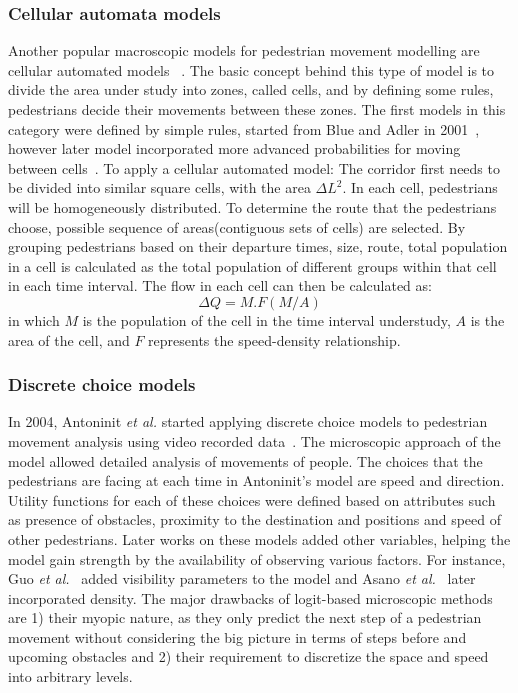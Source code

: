 \subsubsection{Cellular automata models}
Another popular macroscopic models for pedestrian movement modelling are cellular automated models ~\cite{blue2001cellular}. The basic concept behind this type of model is to divide the area under study into zones, called cells, and by defining some rules, pedestrians decide their movements between these zones. The first models in this category were defined by simple rules, started from Blue and Adler in 2001~\cite{blue2001cellular}, however later model incorporated more advanced probabilities for moving between cells~\cite{yamamoto2007simulation,weifeng2003simulation}.	
To apply a cellular automated model: The corridor first needs to be divided into similar square cells, with the area  \(\Delta L^2\). In each cell, pedestrians will be homogeneously distributed. To determine the route that the pedestrians choose, possible sequence of areas(contiguous sets of cells) are selected. By grouping pedestrians based on their departure times, size, route, total population in a cell is calculated as the total population of different groups within that cell in each time interval. The flow in each cell can then be calculated as: 
\begin{equation}
    \Delta Q=M.F(M/A)
\end{equation}
 in which $M$ is the population of the cell in the time interval understudy, $A$ is the area of the cell, and $F$ represents the speed-density relationship. 
 
\subsubsection{Discrete choice models}
In 2004, Antoninit \textit{et al.} started applying discrete choice models to pedestrian movement analysis using video recorded data~\cite{antonini2004simulation}. The microscopic approach of the model allowed detailed analysis of movements of people. The choices that the pedestrians are facing at each time in Antoninit's model are speed and direction. Utility functions for each of these choices were defined based on attributes such as presence of obstacles, proximity to the destination and positions and speed of other pedestrians. Later works on these models added other variables, helping the model gain strength by the availability of observing various factors. For instance, Guo \textit{et al.}~\cite{guo2012route} added visibility parameters to the model and Asano \textit{et al.}~\cite{asano2010microscopic} later incorporated density. The major drawbacks of logit-based microscopic methods are 1) their myopic nature, as they only predict the next step of a pedestrian movement without considering the big picture in terms of steps before and upcoming obstacles and 2) their requirement to discretize the space and speed into arbitrary levels.

